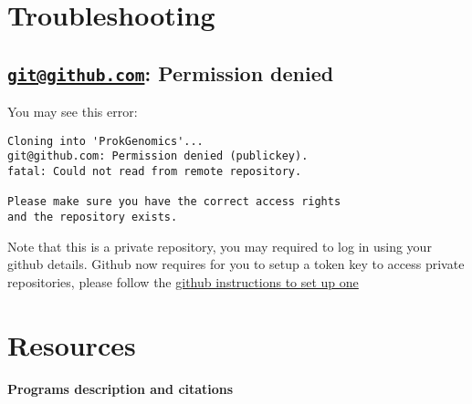 \documentclass[
]{book}
\begin{document}
\hypertarget{troubleshooting}{%
\chapter{Troubleshooting}\label{troubleshooting}}

\hypertarget{gitgithub.com-permission-denied}{%
\section{\texorpdfstring{\href{mailto:git@github.com}{\nolinkurl{git@github.com}}: Permission denied}{git@github.com: Permission denied}}\label{gitgithub.com-permission-denied}}

You may see this error:

\begin{verbatim}
Cloning into 'ProkGenomics'...
git@github.com: Permission denied (publickey).
fatal: Could not read from remote repository.

Please make sure you have the correct access rights
and the repository exists.
\end{verbatim}

Note that this is a private repository, you may required to log in using your github details. Github now requires for you to setup a token key to access private repositories, please follow the \href{https://docs.github.com/en/authentication/keeping-your-account-and-data-secure/managing-your-personal-access-tokens}{github instructions to set up one}

\hypertarget{resources}{%
\chapter{Resources}\label{resources}}

\textbf{Programs description and citations}
\end{document}
